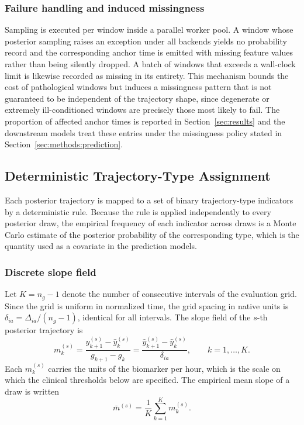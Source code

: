 \subsubsection{Failure handling and induced missingness}

Sampling is executed per window inside a parallel worker pool. A window whose posterior sampling raises an exception under all backends yields no probability record and the corresponding anchor time is emitted with missing feature values rather than being silently dropped. A batch of windows that exceeds a wall-clock limit is likewise recorded as missing in its entirety. This mechanism bounds the cost of pathological windows but induces a missingness pattern that is not guaranteed to be independent of the trajectory shape, since degenerate or extremely ill-conditioned windows are precisely those most likely to fail. The proportion of affected anchor times is reported in Section~\ref{sec:results} and the downstream models treat these entries under the missingness policy stated in Section~\ref{sec:methods:prediction}.

\subsection{Deterministic Trajectory-Type Assignment}
\label{sec:methods:classification}

Each posterior trajectory is mapped to a set of binary trajectory-type indicators by a deterministic rule. Because the rule is applied independently to every posterior draw, the empirical frequency of each indicator across draws is a Monte Carlo estimate of the posterior probability of the corresponding type, which is the quantity used as a covariate in the prediction models.

\subsubsection{Discrete slope field}

Let $K=n_g-1$ denote the number of consecutive intervals of the evaluation grid. Since the grid is uniform in normalized time, the grid spacing in native units is $\delta_{ia}=\Delta_{ia}/(n_g-1)$, identical for all intervals. The slope field of the $s$-th posterior trajectory is
$$m^{(s)}_k=\frac{\hat{y}^{(s)}_{k+1}-\hat{y}^{(s)}_k}{g_{k+1}-g_k}=\frac{\hat{y}^{(s)}_{k+1}-\hat{y}^{(s)}_k}{\delta_{ia}},\qquad k=1,\dots,K.$$
Each $m^{(s)}_k$ carries the units of the biomarker per hour, which is the scale on which the clinical thresholds below are specified. The empirical mean slope of a draw is written
$$\bar{m}^{(s)}=\frac{1}{K}\sum_{k=1}^{K}m^{(s)}_k.$$

